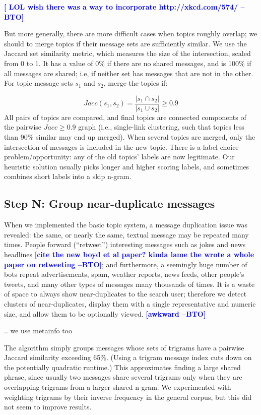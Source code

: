 \documentclass[letterpaper]{article}
\newcommand{\bto}[1]{\textcolor{blue}{\textbf{[#1 --BTO]}}}
\newcommand{\codenote}[1]{}
\begin{document}
\bto{ LOL wish there was a way to incorporate http://xkcd.com/574/ }

But more generally, there are more difficult cases when topics roughly overlap; we should to merge topics if their message sets are sufficiently similar.  We use the Jaccard set similarity metric, which measures the size of the intersection, scaled from 0 to 1.  It has a value of 0\% if there are no shared messages, and is 100\% if all messages are shared; i.e, if neither set has messages that are not in the other.  For topic message sets $s_1$ and $s_2$, merge the topics if:

\[ Jacc(s_1,s_2) = \frac{ |s_1 \cap s_2| }{ |s_1 \cup s_2 | } \geq 0.9 
\]
All pairs of topics are compared, and final topics are connected components of the pairwise $Jacc \geq 0.9$ graph (i.e., single-link clustering, such that topics less than 90\% similar may end up merged).  When several topics are merged, only the intersection of messages is included in the new topic.  There is a label choice problem/opportunity: any of the old topics' labels are now legitimate.  Our heuristic solution usually picks longer and higher scoring labels, and sometimes combines short labels into a skip n-gram.

\subsection{Step N: Group near-duplicate messages}

\codenote{ deduper.py }
When we implemented the basic topic system, a message duplication issue was revealed: the same, or nearly the same, textual message may be repeated many times.  People forward (``retweet'') interesting messages such as jokes and news headlines \bto{cite the new boyd et al paper?  kinda lame the wrote a whole paper on retweeting}; and furthermore, a seemingly huge number of bots repeat advertisements, spam, weather reports, news feeds, other people's tweets, and many other types of messages many thousands of times.  It is a waste of space to always show near-duplicates to the search user; therefore we detect clusters of near-duplicates, display them with a single representative and numeric size, and allow them to be optionally viewed.  \bto{awkward}

.. we use metainfo too

The algorithm simply groups messages whose sets of trigrams have a pairwise Jaccard similarity exceeding 65\%.  (Using a trigram message index cuts down on the potentially quadratic runtime.)  This approximates finding a large shared phrase, since usually two messages share several trigrams only when they are overlapping trigrams from a larger shared n-gram.  We experimented with weighting trigrams by their inverse frequency in the general corpus, but this did not seem to improve results.   
\end{document}
